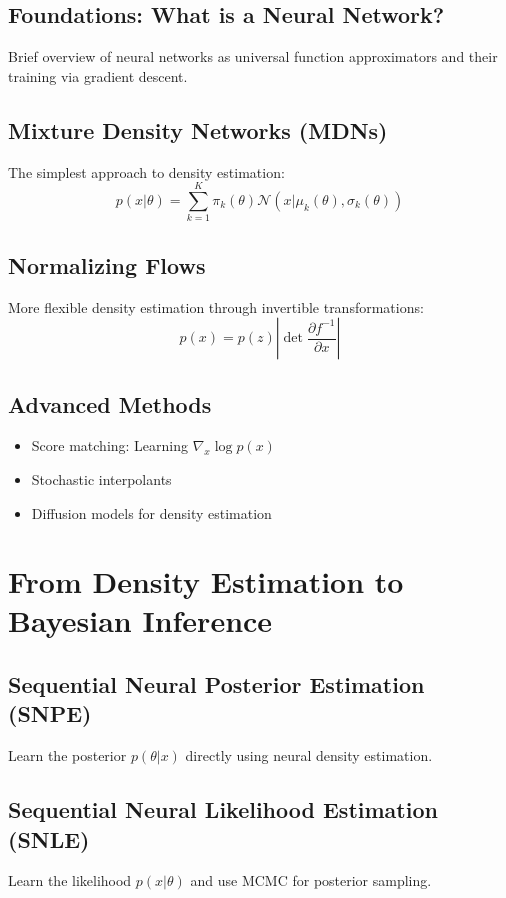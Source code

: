 \documentclass[11pt,a4paper]{article}
\theoremstyle{definition}
\begin{document}
\subsection{Foundations: What is a Neural Network?}
Brief overview of neural networks as universal function approximators and their training via gradient descent.

\subsection{Mixture Density Networks (MDNs)}
The simplest approach to density estimation:
\begin{equation}
    p(x|\theta) = \sum_{k=1}^K \pi_k(\theta) \mathcal{N}(x | \mu_k(\theta), \sigma_k(\theta))
\end{equation}

\subsection{Normalizing Flows}
More flexible density estimation through invertible transformations:
\begin{equation}
    p(x) = p(z) \left| \det \frac{\partial f^{-1}}{\partial x} \right|
\end{equation}

\subsection{Advanced Methods}
\begin{itemize}
    \item Score matching: Learning $\nabla_x \log p(x)$
    \item Stochastic interpolants
    \item Diffusion models for density estimation
\end{itemize}

\section{From Density Estimation to Bayesian Inference}

\subsection{Sequential Neural Posterior Estimation (SNPE)}
Learn the posterior $p(\theta|x)$ directly using neural density estimation.

\subsection{Sequential Neural Likelihood Estimation (SNLE)}
Learn the likelihood $p(x|\theta)$ and use MCMC for posterior sampling.
\end{document}
